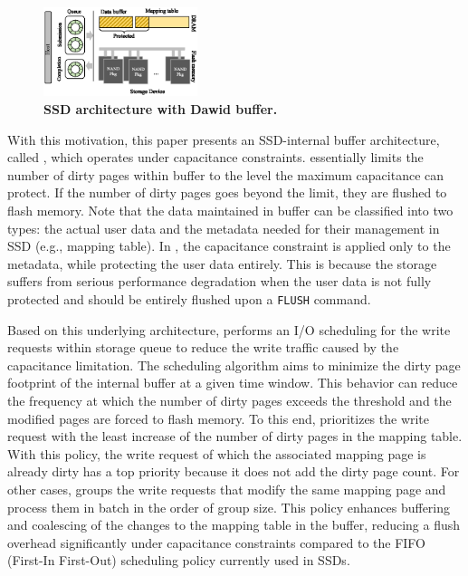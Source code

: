 \begin{figure}[t]
    \centering{}
    \includegraphics[width=0.4\textwidth]{figure/dawid_ssd_archi.eps}
    \caption{\textbf{SSD architecture with Dawid buffer.}}
    \label{fig_spartan_archi}
\end{figure}

With this motivation, this paper presents an SSD-internal buffer architecture, called \ours{}, 
which operates under capacitance constraints. 
\ours{} essentially limits the number of dirty pages within buffer
to the level the maximum capacitance can protect.
If the number of dirty pages goes beyond the limit, they are flushed to flash memory. 
Note that the data maintained in buffer can be classified into two types: the actual user data and 
the metadata needed for their management in SSD (e.g., mapping table). 
In \ours{}, the capacitance constraint is applied only to the metadata, while protecting the user data entirely. 
This is because the storage suffers from serious performance degradation when the user data 
is not fully protected and should be entirely flushed upon a \texttt{FLUSH} command.

Based on this underlying architecture, \ours{} performs an I/O scheduling 
for the write requests within storage queue to reduce the write traffic
caused by the capacitance limitation. The scheduling algorithm aims to minimize the dirty page footprint 
of the internal buffer at a given time window. This behavior can reduce the frequency at which the number of dirty pages
exceeds the threshold and the modified pages are forced to flash memory. 
To this end, \ours{} prioritizes the write request with the least increase 
of the number of dirty pages in the mapping table.
With this policy, the write request of which the associated mapping page is already dirty 
has a top priority because it does not add the dirty page count. For other cases,  
\ours{} groups the write requests that modify the same mapping page 
and process them in batch in the order of group size. 
This policy enhances buffering and coalescing of the changes to the mapping table in the buffer, 
reducing a flush overhead significantly under capacitance constraints
compared to the FIFO (First-In First-Out) scheduling policy currently used in SSDs. 

